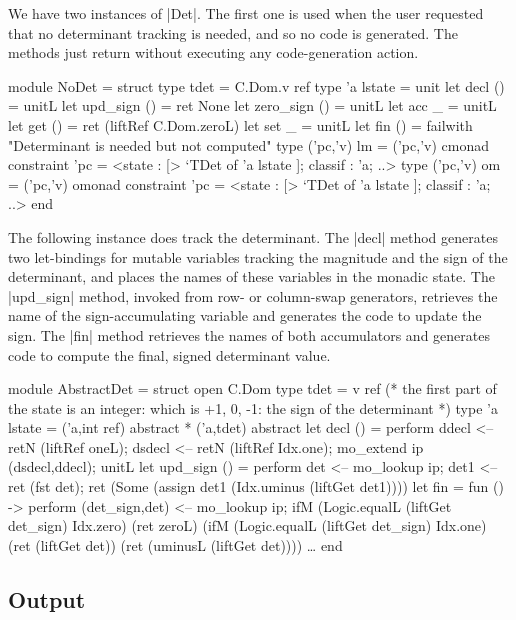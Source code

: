 \documentclass[draft]{elsart}
\begin{document}
We have two instances of |Det|. The first one is used when the user
requested that no determinant tracking is needed, and so no code is
generated. The methods just return without executing any
code-generation action.
\begin{code}
module NoDet =
  struct
  type tdet = C.Dom.v ref
  type 'a lstate = unit
  let decl () = unitL
  let upd_sign () = ret None
  let zero_sign () = unitL
  let acc _ = unitL
  let get () = ret (liftRef C.Dom.zeroL)
  let set _ = unitL
  let fin () = failwith "Determinant is needed but not computed"
  type ('pc,'v) lm = ('pc,'v) cmonad
    constraint 'pc = <state : [> `TDet of 'a lstate ]; classif : 'a; ..>
  type ('pc,'v) om = ('pc,'v) omonad
    constraint 'pc = <state : [> `TDet of 'a lstate ]; classif : 'a; ..>
end
\end{code}

The following instance does track the determinant. The |decl| method
generates two let-bindings for mutable variables tracking the
magnitude and the sign of the determinant, and places the names of
these variables in the monadic state. The |upd_sign| method, invoked
from row- or column-swap generators, retrieves the name of the
sign-accumulating variable and generates the code to update the
sign. The |fin| method retrieves the names of both accumulators and
generates code to compute the final, signed determinant value.
\begin{code}
module AbstractDet =
  struct
  open C.Dom
  type tdet = v ref
  (* the first part of the state is an integer: which is +1, 0, -1:
     the sign of the determinant *)
  type 'a lstate = ('a,int ref) abstract * ('a,tdet) abstract
  let decl () = perform
      ddecl <-- retN (liftRef oneL);
      dsdecl <-- retN (liftRef Idx.one);
      mo_extend ip (dsdecl,ddecl);
      unitL
  let upd_sign () = perform
      det <-- mo_lookup ip;
      det1 <-- ret (fst det);
      ret (Some (assign det1 (Idx.uminus (liftGet det1))))
  let fin = fun () -> perform
      (det_sign,det) <-- mo_lookup ip;
      ifM (Logic.equalL (liftGet det_sign) Idx.zero) (ret zeroL)
      (ifM (Logic.equalL (liftGet det_sign) Idx.one) (ret (liftGet det))
          (ret (uminusL (liftGet det))))
  \dots
end
\end{code}


\subsection{Output}
\end{document}
